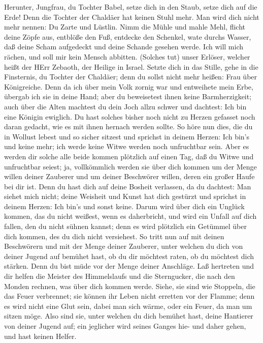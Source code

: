  Herunter, Jungfrau, du Tochter Babel, setze dich in den
Staub, setze dich auf die Erde! Denn die Tochter der Chaldäer hat keinen
Stuhl mehr. Man wird dich nicht mehr nennen: Du Zarte und Lüstlin.
 Nimm die Mühle und mahle Mehl, flicht deine Zöpfe aus,
entblöße den Fuß, entdecke den Schenkel, wate durchs Wasser,
 daß deine Scham aufgedeckt und deine Schande gesehen werde.
Ich will mich rächen, und soll mir kein Mensch abbitten. 
(Solches tut) unser Erlöser, welcher heißt der HErr Zebaoth, der Heilige
in Israel.  Setzte dich in das Stille, gehe in die
Finsternis, du Tochter der Chaldäer; denn du sollst nicht mehr heißen:
Frau über Königreiche.  Denn da ich über mein Volk zornig
war und entweihete mein Erbe, übergab ich sie in deine Hand; aber du
beweisetest ihnen keine Barmherzigkeit; auch über die Alten machtest du
dein Joch allzu schwer  und dachtest: Ich bin eine Königin
ewiglich. Du hast solches bisher noch nicht zu Herzen gefasset noch
daran gedacht, wie es mit ihnen hernach werden sollte.  So
höre nun dies, die du in Wollust lebest und so sicher sitzest und
sprichst in deinem Herzen: Ich bin's und keine mehr; ich werde keine
Witwe werden noch unfruchtbar sein.  Aber es werden dir
solche alle beide kommen plötzlich auf einen Tag, daß du Witwe und
unfruchtbar seiest; ja, vollkömmlich werden sie über dich kommen um der
Menge willen deiner Zauberer und um deiner Beschwörer willen, deren ein
großer Haufe bei dir ist.  Denn du hast dich auf deine
Bosheit verlassen, da du dachtest: Man siehet mich nicht; deine Weisheit
und Kunst hat dich gestürzt und sprichst in deinem Herzen: Ich bin's und
sonst keine.  Darum wird über dich ein Unglück kommen, das
du nicht weißest, wenn es daherbricht, und wird ein Unfall auf dich
fallen, den du nicht sühnen kannst; denn es wird plötzlich ein Getümmel
über dich kommen, des du dich nicht versiehest.  So tritt
nun auf mit deinen Beschwörern und mit der Menge deiner Zauberer, unter
welchen du dich von deiner Jugend auf bemühet hast, ob du dir möchtest
raten, ob du möchtest dich stärken.  Denn du bist müde vor
der Menge deiner Anschläge. Laß hertreten und dir helfen die Meister des
Himmelslaufs und die Sterngucker, die nach den Monden rechnen, was über
dich kommen werde.  Siehe, sie sind wie Stoppeln, die das
Feuer verbrennet; sie können ihr Leben nicht erretten vor der Flamme;
denn es wird nicht eine Glut sein, dabei man sich wärme, oder ein Feuer,
da man um sitzen möge.  Also sind sie, unter welchen du
dich bemühet hast, deine Hantierer von deiner Jugend auf; ein jeglicher
wird seines Ganges hie- und daher gehen, und hast keinen Helfer.

